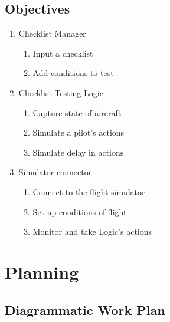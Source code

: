 \documentclass[a4paper]{article}
\begin{document}
\subsection*{Objectives}
\begin{enumerate}
    \item Checklist Manager
    \begin{enumerate}
        \item Input a checklist
        \item Add conditions to test        
    \end{enumerate}
    \item Checklist Testing Logic
    \begin{enumerate}
        \item Capture state of aircraft
        \item Simulate a pilot's actions
        \item Simulate delay in actions
    \end{enumerate}
    \item Simulator connector
    \begin{enumerate}
        \item Connect to the flight simulator
        \item Set up conditions of flight
        \item Monitor and take Logic's actions
    \end{enumerate}
\end{enumerate}

\section{Planning}
\subsection{Diagrammatic Work Plan}

\end{document}
